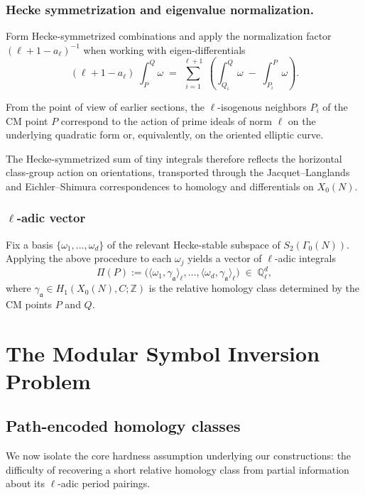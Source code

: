 \documentclass[10pt]{amsart}
\theoremstyle{theostyle}
\newcommand{\QQ}{\mathbb{Q}} \newcommand{\RR}{\mathbb{R}}
\newcommand{\ZZ}{\mathbb{Z}}
\renewcommand{\fa}{\mathfrak{a}} \newcommand{\fb}{\mathfrak{b}} \newcommand{\fc}{\mathfrak{c}}
\begin{document}
\subsubsection*{Hecke symmetrization and eigenvalue normalization.}
Form Hecke-symmetrized combinations and apply the normalization factor $(\ell+1-a_\ell)^{-1}$ when working with eigen-differentials
$$(\ell+1-a_\ell)\; \int_P^Q\omega \; =\; \sum_{i=1}^{\ell+1}\; \left(\int_{Q_i}^{Q}\omega\; -\; \int_{P_i}^{P}\omega\right).$$

From the point of view of earlier sections, the $\ell$-isogenous neighbors
$P_i$ of the CM point $P$ correspond to the action of prime ideals of norm $\ell$
on the underlying quadratic form or, equivalently, on the oriented elliptic curve.  

The Hecke-symmetrized sum of tiny integrals therefore reflects the
horizontal class-group action on orientations, transported through the
Jacquet--Langlands and Eichler--Shimura correspondences to homology and
differentials on $X_0(N)$.
\subsubsection*{$\ell$-adic vector}Fix a basis $\{\omega_1,\dots,\omega_d\}$ of the relevant Hecke-stable
subspace of $S_2(\Gamma_0(N))$.  Applying the above procedure to each
$\omega_j$ yields a vector of $\ell$-adic integrals
\[
\Pi(P) :=
\bigl(
\langle \omega_1,\gamma_\fa\rangle_\ell,\dots,
\langle \omega_d,\gamma_\fa\rangle_\ell
\bigr)
\;\in\; \QQ_\ell^d,
\]
where $\gamma_\fa\in H_1(X_0(N),C;\ZZ)$ is the relative homology class determined
by the CM points $P$ and $Q$.



\section{The Modular Symbol Inversion Problem}
\label{sec:MSI}

\subsection{Path-encoded homology classes}
\label{subsec:pathencoded}

We now isolate the core hardness assumption underlying our constructions: the
difficulty of recovering a short relative homology class from partial
information about its $\ell$-adic period pairings.
\end{document}

